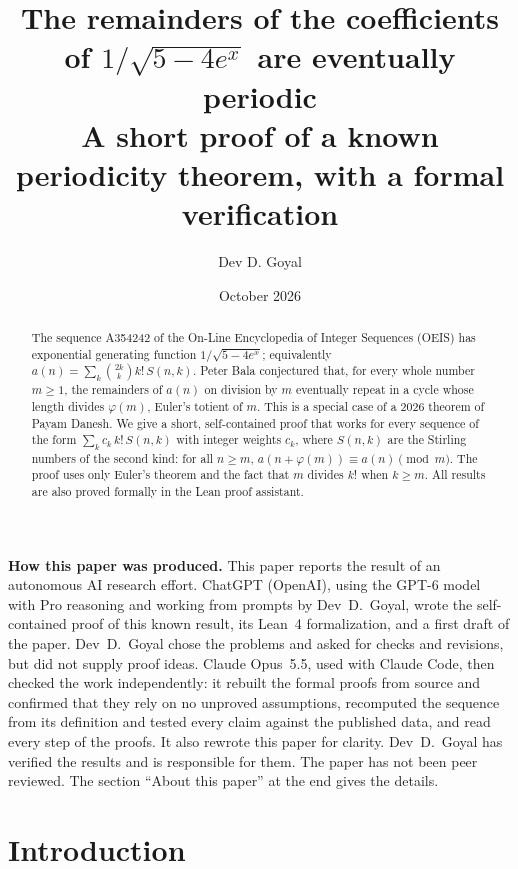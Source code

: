 \documentclass[11pt,a4paper]{article}
\title{The remainders of the coefficients of $1/\sqrt{5-4e^x}$ are eventually periodic\\[6pt]\large A short proof of a known periodicity theorem, with a formal verification}
\author{Dev D. Goyal}
\date{October 2026}
\theoremstyle{definition}
\theoremstyle{remark}
\begin{document}
\maketitle
\begin{abstract}
The sequence A354242 of the On-Line Encyclopedia of Integer Sequences (OEIS) has exponential generating function $1/\sqrt{5-4e^x}$; equivalently $a(n)=\sum_k\binom{2k}{k}k!\,S(n,k)$. Peter Bala conjectured that, for every whole number $m\ge1$, the remainders of $a(n)$ on
division by $m$ eventually repeat in a cycle whose length divides $\varphi(m)$, Euler's totient of $m$. This is a special
case of a 2026 theorem of Payam Danesh. We give a short, self-contained proof that works for every sequence of the form
$\sum_k c_k\,k!\,S(n,k)$ with integer weights $c_k$, where $S(n,k)$ are the Stirling numbers of the second kind: for all
$n\ge m$, $a(n+\varphi(m))\equiv a(n)\pmod m$. The proof uses only Euler's theorem and the fact that $m$ divides $k!$
when $k\ge m$. All results are also proved formally in the Lean proof assistant.
\end{abstract}
\begin{center}\begin{minipage}{0.88\linewidth}\small
\textbf{How this paper was produced.} This paper reports the result of an autonomous AI research effort.
ChatGPT (OpenAI), using the GPT-6 model with Pro reasoning and working from prompts by Dev~D.~Goyal, wrote the self-contained proof of this known result, its Lean~4 formalization, and a first draft of the paper.
Dev~D.~Goyal chose the problems and asked for checks and revisions, but did not supply proof ideas.
Claude Opus~5.5, used with Claude Code, then checked the work independently: it rebuilt the formal proofs from
source and confirmed that they rely on no unproved assumptions, recomputed the sequence from its definition and tested
every claim against the published data, and read every step of the proofs. It also rewrote this paper for clarity.
Dev~D.~Goyal has verified the results and is responsible for them. The paper has not been peer reviewed.
The section ``About this paper'' at the end gives the details.
\end{minipage}\end{center}

\section{Introduction}
\end{document}
